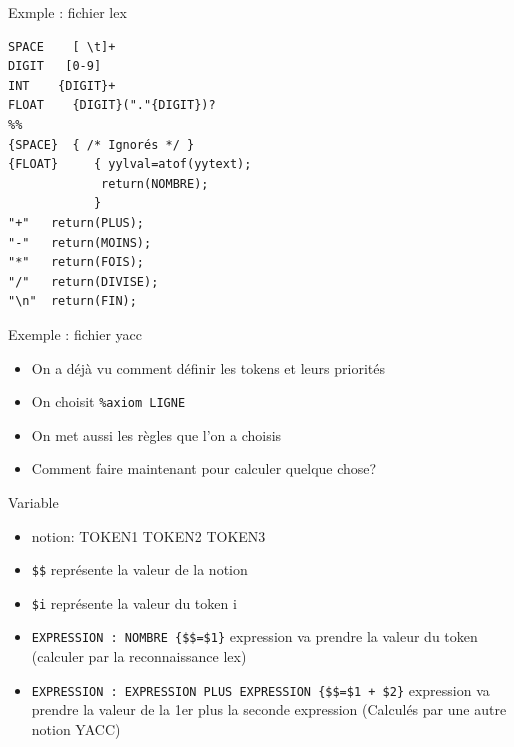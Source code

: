 \begin{frame}[containsverbatim]{\ftitle}
\def\blocktitle{Exmple : fichier lex}
\begin{block}{\blocktitle}
\begin{verbatim}
SPACE    [ \t]+
DIGIT   [0-9]
INT    {DIGIT}+
FLOAT    {DIGIT}("."{DIGIT})?
%%
{SPACE}  { /* Ignorés */ }
{FLOAT}		{ yylval=atof(yytext);
      		 return(NOMBRE);
    		}
"+"   return(PLUS);
"-"   return(MOINS);
"*"   return(FOIS);
"/"   return(DIVISE);
"\n"  return(FIN);
\end{verbatim}
\end{block}
\end{frame}


\begin{frame}[containsverbatim]{\ftitle}
\def\blocktitle{Exemple : fichier yacc}
\begin{block}{\blocktitle}
\begin{itemize}
\item On a déjà vu comment définir les tokens et leurs priorités
\item On choisit \verb!%axiom LIGNE!
\item On met aussi les règles que l'on a choisis
\item Comment faire maintenant pour calculer quelque chose?
\end{itemize}

\def\blocktitle{Variable}
\begin{block}{\blocktitle}
\begin{itemize}
\item notion: TOKEN1 TOKEN2 TOKEN3
\item \verb!$$! représente la valeur de la notion
\item \verb!$i! représente la valeur du token i %
\item \verb!EXPRESSION : NOMBRE {$$=$1}! expression va prendre la valeur du token (calculer par la reconnaissance lex)
\item \verb!EXPRESSION : EXPRESSION PLUS EXPRESSION {$$=$1 + $2}! expression va prendre la valeur de la 1er plus la seconde expression (Calculés par une autre notion YACC)%
\end{itemize}
\end{block}
\end{block}
\end{frame}


